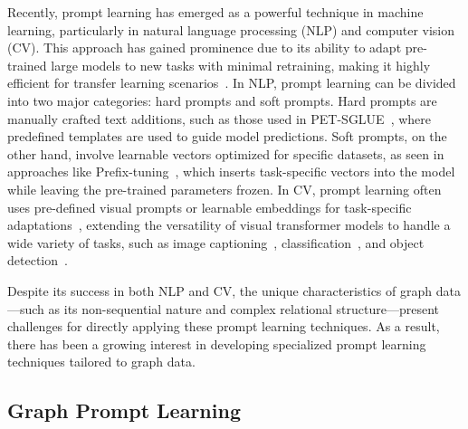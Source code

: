 Recently, prompt learning has emerged as a powerful technique in machine learning, particularly in natural language processing (NLP) and computer vision (CV). This approach has gained prominence due to its ability to adapt pre-trained large models to new tasks with minimal retraining, making it highly efficient for transfer learning scenarios~\cite{schick2021s, li2021prefix, zhou2022learning, zhou2022conditional, jia2022visual, chen2022adaptformer}. In NLP, prompt learning can be divided into two major categories: hard prompts and soft prompts. Hard prompts are manually crafted text additions, such as those used in PET-SGLUE~\cite{schick2021s}, where predefined templates are used to guide model predictions. Soft prompts, on the other hand, involve learnable vectors optimized for specific datasets, as seen in approaches like Prefix-tuning~\cite{li2021prefix}, which inserts task-specific vectors into the model while leaving the pre-trained parameters frozen. In CV, prompt learning often uses pre-defined visual prompts or learnable embeddings for task-specific adaptations~\cite{jia2022visual, chen2022adaptformer, deng2023prompt, hu2022promptcap, zheng2024exploring, du2022learning, li2024learning, luo2024vscode}, extending the versatility of visual transformer models to handle a wide variety of tasks, such as image captioning~\cite{deng2023prompt, hu2022promptcap}, classification~\cite{zheng2024exploring}, and object detection~\cite{du2022learning, li2024learning, luo2024vscode}.

Despite its success in both NLP and CV, the unique characteristics of graph data—such as its non-sequential nature and complex relational structure—present challenges for directly applying these prompt learning techniques. As a result, there has been a growing interest in developing specialized prompt learning techniques tailored to graph data.

\subsection{Graph Prompt Learning}

